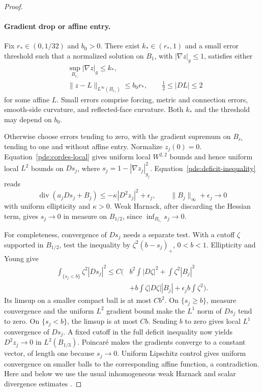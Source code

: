 \begin{proof}
\paragraph{Gradient drop or affine entry.}
Fix \(r_*\in(0,1/32)\) and \(b_0>0\).  There exist
\(k_*\in(r_*,1)\) and a small error threshold such that a normalized
solution on \(B_1\), with \(|\nabla z|_g\le1\), satisfies either
\begin{align}
 &\sup_{B_{r_*}}|\nabla z|_g\le k_*,
 \label{pde:gradient-drop}\\
 &\|z-L\|_{L^\infty(B_{r_*})}\le b_0r_*,
 \qquad \tfrac12\le|DL|\le2
 \label{pde:affine-entry}
\end{align}
for some affine \(L\).  Small errors comprise forcing, metric and
connection errors, smooth-side curvature, and reflected-face curvature.
Both \(k_*\) and the threshold may depend on \(b_0\).

Otherwise choose errors tending to zero, with the gradient supremum on
\(B_{r_*}\) tending to one and without affine entry.  Normalize
\(z_j(0)=0\).  Equation~\eqref{pde:cordes-local} gives uniform local
\(W^{2,2}\) bounds and hence uniform local \(L^2\) bounds on
\(Ds_j\), where \(s_j=1-|\nabla z_j|_{g_j}^2\).
Equation~\eqref{pde:deficit-inequality} reads
\[
 \operatorname{div}(a_jDs_j+B_j)
 \le-\kappa|D^2z_j|^2+\epsilon_j,\qquad
 \|B_j\|_\infty+\epsilon_j\longrightarrow0
\]
with uniform ellipticity and \(\kappa>0\).
Weak Harnack, after discarding the Hessian term, gives
\(s_j\to0\) in measure on \(B_{1/2}\), since
\(\inf_{B_{r_*}}s_j\to0\).

For completeness, convergence of \(Ds_j\) needs a separate test.
With a cutoff \(\zeta\) supported in \(B_{1/2}\), test the inequality
by \(\zeta^2(b-s_j)_+\), \(0<b<1\).  Ellipticity and Young give
\begin{align}
 \int_{\{s_j<b\}}\zeta^2|Ds_j|^2
 \le C\bigg(&b^2\int|D\zeta|^2+\int\zeta^2|B_j|^2
 \nonumber\\
 &+b\int\zeta|D\zeta||B_j|
   +\epsilon_j b\int\zeta^2\bigg).
 \label{pde:lower-truncation}
\end{align}
Its limsup on a smaller compact ball is at most \(Cb^2\).
On \(\{s_j\ge b\}\), measure convergence and the uniform \(L^2\)
gradient bound make the \(L^1\) norm of \(Ds_j\) tend to zero.
On \(\{s_j<b\}\), the limsup is at most \(Cb\).
Sending \(b\) to zero gives local \(L^1\) convergence of \(Ds_j\).
A fixed cutoff in the full deficit inequality now yields
\(D^2z_j\to0\) in \(L^2(B_{1/3})\).
Poincar\'e makes the gradients converge to a constant vector, of length
one because \(s_j\to0\).  Uniform Lipschitz control gives uniform
convergence on smaller balls to the corresponding affine function,
a contradiction.  Here and below we use the usual inhomogeneous weak
Harnack and scalar divergence estimates
\cite{GilbargTrudinger2001}.


\end{proof}
